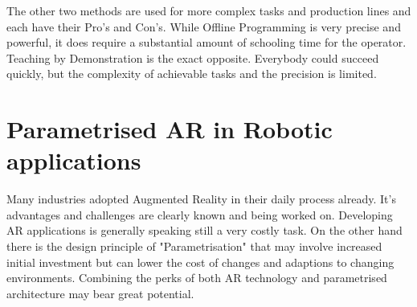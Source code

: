 The other two methods are used for more complex tasks and production lines and each have their Pro's and Con's. While Offline Programming is very precise and powerful, it does require a substantial amount of schooling time for the operator. Teaching by Demonstration is the exact opposite. Everybody could succeed quickly, but the complexity of achievable tasks and the precision is limited.

\section{Parametrised AR in Robotic applications}

Many industries adopted Augmented Reality in their daily process already. It's advantages and challenges are clearly known and being worked on. Developing AR applications is generally speaking still a very costly task. On the other hand there is the design principle of "Parametrisation" that may involve increased initial investment but can lower the cost of changes and adaptions to changing environments. Combining the perks of both AR technology and parametrised architecture may bear great potential.













